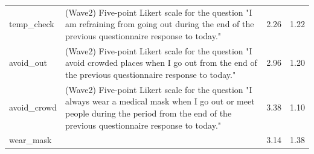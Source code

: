 \documentclass[
]{article}
\begin{document}
\begin{table}[!h]
\begin{tabular}[t]{l>{\raggedright\arraybackslash}p{30em}cc}
temp\_check & (Wave2) Five-point Likert scale for the question "I am refraining from going out during the end of the previous questionnaire response to today." & \num{2.26} & \num{1.22}\\
avoid\_out & (Wave2) Five-point Likert scale for the question "I avoid crowded places when I go out from the end of the previous questionnaire response to today." & \num{2.96} & \num{1.20}\\
avoid\_crowd & (Wave2) Five-point Likert scale for the question "I always wear a medical mask when I go out or meet people during the period from the end of the previous questionnaire response to today." & \num{3.38} & \num{1.10}\\
wear\_mask &  & \num{3.14} & \num{1.38}\\
\bottomrule
\end{tabular}
\end{table}
\end{document}
